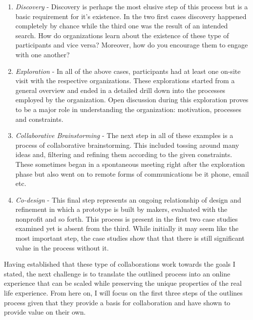 \begin{enumerate}

\item \textit{Discovery} - Discovery is perhaps the most elusive step of this process but is a basic requirement for it's existence. In the two first cases discovery happened completely by chance while the third one was the result of an intended search. How do organizations learn about the existence of these type of participants and vice versa? Moreover, how do you encourage them to engage with one another? 

\item \textit{Exploration} - In all of the above cases, participants had at least one on-site visit with the respective organizations. These explorations started from a general overview and ended in a detailed drill down into the processes employed by the organization. Open discussion during this exploration proves to be a major role in understanding the organization: motivation, processes and constraints. 

\item \textit{Collaborative Brainstorming} - The next step in all of these examples is a process of collaborative brainstorming. This included tossing around many ideas and, filtering and refining them according to the given constraints. These sometimes began in a spontaneous meeting right after the exploration phase but also went on to remote forms of communications be it phone, email etc.

\item \textit{Co-design} - This final step represents an ongoing relationship of design and refinement in which a prototype is built by makers, evaluated with the nonprofit and so forth. This process is present in the first two case studies examined yet is absent from the third. While initially it may seem like the most important step, the case studies show that that there is still significant value in the process without it. 

\end{enumerate}
 
Having established that these type of collaborations work towards the goals I stated, the next challenge is to translate the outlined process into an online experience that can be scaled while preserving the unique properties of the real life experience. From here on, I will focus on the first three steps of the outlines process given that they provide a basis for collaboration and have shown to provide value on their own.